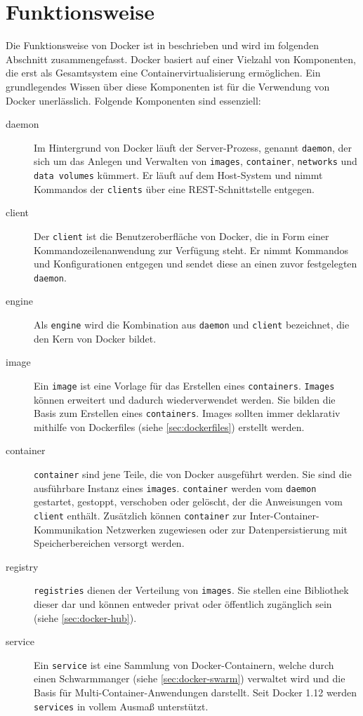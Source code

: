 \section{Funktionsweise}
\label{sec:docker-basics}
Die Funktionsweise von Docker ist in \autocite{docker-overview:online} beschrieben und wird im folgenden Abschnitt zusammengefasst.
Docker basiert auf einer Vielzahl von Komponenten, die erst als Gesamtsystem eine Containervirtualisierung ermöglichen.
Ein grundlegendes Wissen über diese Komponenten ist für die Verwendung von Docker unerlässlich.
Folgende Komponenten sind essenziell:
\begin{description}
    \item [daemon] Im Hintergrund von Docker läuft der Server-Prozess, genannt \texttt{daemon}, der sich um das Anlegen und Verwalten von \texttt{images}, \texttt{container}, \texttt{networks} und \texttt{data volumes} kümmert.
    Er läuft auf dem Host-System und nimmt Kommandos der \texttt{clients} über eine REST-Schnittstelle entgegen.
    \item [client] Der \texttt{client} ist die Benutzeroberfläche von Docker, die in Form einer Kommandozeilenanwendung zur Verfügung steht.
    Er nimmt Kommandos und Konfigurationen entgegen und sendet diese an einen zuvor festgelegten \texttt{daemon}.
    \item [engine] Als \texttt{engine} wird die Kombination aus \texttt{daemon} und \texttt{client} bezeichnet, die den Kern von Docker bildet.
    \item [image] Ein \texttt{image} ist eine Vorlage für das Erstellen eines \texttt{containers}. \texttt{Images} können erweitert und dadurch wiederverwendet werden. Sie bilden die Basis zum Erstellen eines \texttt{containers}. Images sollten immer deklarativ mithilfe von Dockerfiles (siehe \cref{sec:dockerfiles}) erstellt werden.
    \item [container] \texttt{container} sind jene Teile, die von Docker ausgeführt werden. Sie sind die ausführbare Instanz eines \texttt{images}. \texttt{container} werden vom \texttt{daemon} gestartet, gestoppt, verschoben oder gelöscht, der die Anweisungen vom \texttt{client} enthält. Zusätzlich können \texttt{container} zur Inter-Container-Kommunikation Netzwerken zugewiesen oder zur Datenpersistierung mit Speicherbereichen versorgt werden.
    \item [registry] \texttt{registries} dienen der Verteilung von \texttt{images}. Sie stellen eine Bibliothek dieser dar und können entweder privat oder öffentlich zugänglich sein (siehe \cref{sec:docker-hub}).
    \item [service] Ein \texttt{service} ist eine Sammlung von Docker-Containern, welche durch einen Schwarmmanger (siehe \cref{sec:docker-swarm}) verwaltet wird und die Basis für Multi-Container-Anwendungen darstellt. Seit Docker 1.12 werden \texttt{services} in vollem Ausmaß unterstützt.
\end{description}
